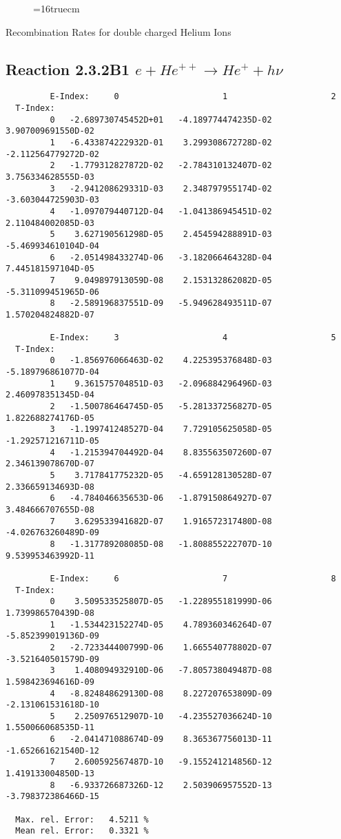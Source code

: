 \documentclass[12pt]{article}
\begin{document}
\begin{figure} \label{2.3.2B0}
\epsfxsize=16truecm
\end{figure}
\newpage
  Recombination Rates for double charged Helium Ions

\subsection{
Reaction 2.3.2B1  $e + He^{++} \rightarrow He^+ + h\nu$
}


\begin{small}\begin{verbatim}
         E-Index:     0                     1                     2
  T-Index:
         0   -2.689730745452D+01   -4.189774474235D-02    3.907009691550D-02
         1   -6.433874222932D-01    3.299308672728D-02   -2.112564779272D-02
         2   -1.779312827872D-02   -2.784310132407D-02    3.756334628555D-03
         3   -2.941208629331D-03    2.348797955174D-02   -3.603044725903D-03
         4   -1.097079440712D-04   -1.041386945451D-02    2.110484002085D-03
         5    3.627190561298D-05    2.454594288891D-03   -5.469934610104D-04
         6   -2.051498433274D-06   -3.182066464328D-04    7.445181597104D-05
         7    9.049897913059D-08    2.153132862082D-05   -5.311099451965D-06
         8   -2.589196837551D-09   -5.949628493511D-07    1.570204824882D-07

         E-Index:     3                     4                     5
  T-Index:
         0   -1.856976066463D-02    4.225395376848D-03   -5.189796861077D-04
         1    9.361575704851D-03   -2.096884296496D-03    2.460978351345D-04
         2   -1.500786464745D-05   -5.281337256827D-05    1.822688274176D-05
         3   -1.199741248527D-04    7.729105625058D-05   -1.292571216711D-05
         4   -1.215394704492D-04    8.835563507260D-07    2.346139078670D-07
         5    3.717841775232D-05   -4.659128130528D-07    2.336659134693D-08
         6   -4.784046635653D-06   -1.879150864927D-07    3.484666707655D-08
         7    3.629533941682D-07    1.916572317480D-08   -4.026763260489D-09
         8   -1.317789208085D-08   -1.808855222707D-10    9.539953463992D-11

         E-Index:     6                     7                     8
  T-Index:
         0    3.509533525807D-05   -1.228955181999D-06    1.739986570439D-08
         1   -1.534423152274D-05    4.789360346264D-07   -5.852399019136D-09
         2   -2.723344400799D-06    1.665540778802D-07   -3.521640501579D-09
         3    1.408094932910D-06   -7.805738049487D-08    1.598423694616D-09
         4   -8.824848629130D-08    8.227207653809D-09   -2.131061531618D-10
         5    2.250976512907D-10   -4.235527036624D-10    1.550066068535D-11
         6   -2.041471088674D-09    8.365367756013D-11   -1.652661621540D-12
         7    2.600592567487D-10   -9.155241214856D-12    1.419133004850D-13
         8   -6.933726687326D-12    2.503906957552D-13   -3.798372386466D-15

  Max. rel. Error:   4.5211 %
  Mean rel. Error:   0.3321 %

\end{verbatim}\end{small}
\end{document}
